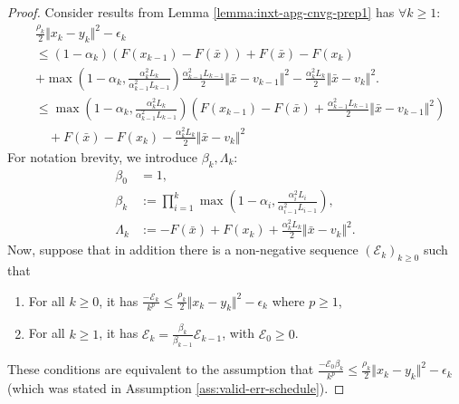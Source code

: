\documentclass[12pt]{article}
\begin{document}
    \begin{proof}
        Consider results from Lemma \ref{lemma:inxt-apg-cnvg-prep1} has $\forall k \ge 1$: 
        \begin{align*}
            & \frac{\rho_k}{2}\Vert x_k - y_k\Vert^2 - \epsilon_k
            \\
            &\le 
            (1 - \alpha_k)(F(x_{k - 1}) - F(\bar x)) + F(\bar x) - F(x_k) 
            \\ &
            + \max\left(
                    1 - \alpha_k, \frac{\alpha_k^2L_k}{\alpha_{k - 1}^2L_{k - 1}}
                \right)\frac{\alpha_{k - 1}^2L_{k - 1}}{2}\Vert \bar x - v_{k - 1}\Vert^2 
            - \frac{\alpha_k^2L_k}{2}\Vert \bar x - v_k\Vert^2. 
            \\
            &\le \max\left(
                1 - \alpha_k, \frac{\alpha_k^2L_k}{\alpha_{k - 1}^2L_{k - 1}}
            \right)\left(
                F(x_{k - 1}) - F(\bar x)
                + \frac{\alpha_{k - 1}^2L_{k - 1}}{2}\Vert \bar x - v_{k - 1}\Vert^2 
            \right)
            \\&\quad 
                + F(\bar x) - F(x_k) - \frac{\alpha_k^2L_k}{2}\Vert \bar x - v_k\Vert^2
        \end{align*}
        For notation brevity, we introduce $\beta_k, \Lambda_k$: 
        \begin{align*}
            \beta_0 &= 1, 
            \\
            \beta_k &:= \prod_{i = 1}^{k} \max\left(
                1 - \alpha_i, \frac{\alpha_i^2L_i}{\alpha_{i - 1}^2L_{i - 1}}
            \right),
            \\
            \Lambda_k &:= 
            - F(\bar x) + F(x_k) + \frac{\alpha_k^2L_k}{2}\Vert \bar x - v_k\Vert^2. 
        \end{align*}
        Now, suppose that in addition there is a non-negative sequence $(\mathcal  E_k)_{k \ge 0}$ such that 
        \begin{enumerate}[nosep]
            \item For all $k \ge 0$, it has $\frac{-\mathcal E_k}{k^p} \le \frac{\rho_k}{2}\Vert x_k - y_k\Vert^2 - \epsilon_k$ where $p \ge 1$, 
            \item For all $k \ge 1$, it has $\mathcal E_k = \frac{\beta_k}{\beta_{k - 1}}\mathcal E_{k - 1}$, with $\mathcal E_0 \ge 0$. 
        \end{enumerate}
        These conditions are equivalent to the assumption that $\frac{- \mathcal E_0\beta_k}{k^p} \le \frac{\rho_k}{2}\Vert x_k - y_k\Vert^2 - \epsilon_k$ (which was stated in Assumption \ref{ass:valid-err-schedule}). 

\end{proof}
\end{document}
